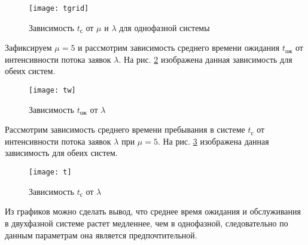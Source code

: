 \begin{figure}[H]
	\vspace{-0.5cm}
	\centering
	\texttt{[image: tgrid]}
	\caption{Зависимость $t_\text{с}$ от $\mu$ и $\lambda$ для однофазной системы}
	\label{fig:tgrid}
	\vspace{-0.5cm}
\end{figure}

\newpage

Зафиксируем $\mu = 5$ и рассмотрим зависимость среднего времени ожидания $t_\text{ож}$ от интенсивности потока заявок $\lambda$. На рис. \ref{fig:tw} изображена данная зависимость для обеих систем.
\begin{figure}[H]
	\vspace{-0.4cm}
	\centering
	\texttt{[image: tw]}
	\caption{Зависимость $t_\text{ож}$ от $\lambda$}
	\label{fig:tw}
	\vspace{-0.3cm}
\end{figure}

Рассмотрим зависимость среднего времени пребывания в системе $t_\text{с}$ от интенсивности потока заявок $\lambda$ при $\mu = 5$. На рис. \ref{fig:t} изображена данная зависимость для обеих систем.
\begin{figure}[H]
	\vspace{-0.4cm}
	\centering
	\texttt{[image: t]}
	\caption{Зависимость $t_\text{с}$ от $\lambda$}
	\label{fig:t}
	\vspace{-0.3cm}
\end{figure}

Из графиков можно сделать вывод, что среднее время ожидания и обслуживания в двухфазной системе растет медленнее, чем в однофазной, следовательно по данным параметрам она является предпочтительной.


